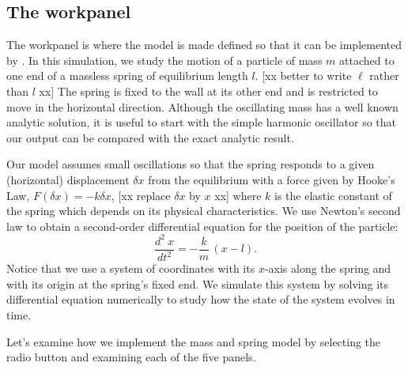 \subsection{The  workpanel}\label{section:02Model}

The  workpanel is where the model is made defined so that it can be implemented by \ejs. In this
simulation, we study the motion of a particle of mass $m$ attached to one end of a massless spring of equilibrium
length $l$. [xx better to write $\ell$ rather than $l$ xx] The spring is fixed to the wall at its other end and is restricted to move in the horizontal direction.
Although the oscillating mass has a well known analytic solution, it is useful to start with the simple harmonic
oscillator so that our output can be compared with the exact analytic result.

Our model assumes small oscillations so that the spring responds to a given (horizontal) displacement $\delta x$
from the equilibrium with a force given by Hooke's Law, $F(\delta x) = - k \delta x$, [xx replace $\delta x$ by $x$ xx] where $k$ is
the elastic constant of the spring which depends on its physical characteristics. We use Newton's second
law to obtain a second-order differential equation for the position of the particle:
\begin{equation}
  \frac{d^2\ x}{dt^2} = -\frac{k}{m}\,(x-l). \label{eq:02EjsIntro/SpringBasic}
\end{equation}
Notice that we use a system of coordinates with its $x$-axis along the spring and with its origin at the
spring's fixed end. We simulate this system by solving its differential equation numerically to study how the state of the system evolves in time.

Let's examine how we implement the mass and spring model by selecting the  radio button and examining each of
the five panels.

